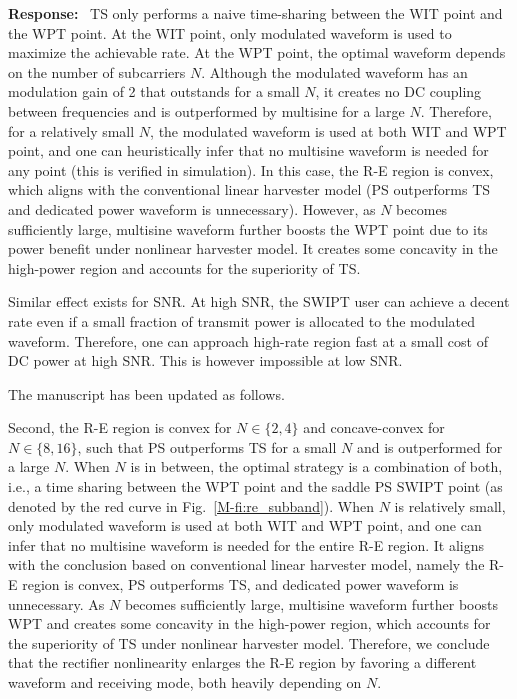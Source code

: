 \documentclass{article}
\newcounter{reviewer}
\newcounter{point}[reviewer]
\newcounter{response}[reviewer]
\newenvironment{response}
	{\refstepcounter{response} \medskip \noindent \textbf{Response:}\ }
	{\medskip}
\begin{document}
\begin{reviewer}
\begin{response}
			TS only performs a naive time-sharing between the WIT point and the WPT point. At the WIT point, only modulated waveform is used to maximize the achievable rate. At the WPT point, the optimal waveform depends on the number of subcarriers $N$. Although the modulated waveform has an modulation gain of \num{2} that outstands for a small $N$, it creates no DC coupling between frequencies and is outperformed by multisine for a large $N$. Therefore, for a relatively small $N$, the modulated waveform is used at both WIT and WPT point, and one can heuristically infer that no multisine waveform is needed for any point (this is verified in simulation). In this case, the R-E region is convex, which aligns with the conventional linear harvester model (PS outperforms TS and dedicated power waveform is unnecessary). However, as $N$ becomes sufficiently large, multisine waveform further boosts the WPT point due to its power benefit under nonlinear harvester model. It creates some concavity in the high-power region and accounts for the superiority of TS.

			Similar effect exists for SNR. At high SNR, the SWIPT user can achieve a decent rate even if a small fraction of transmit power is allocated to the modulated waveform. Therefore, one can approach high-rate region fast at a small cost of DC power at high SNR. This is however impossible at low SNR.

			The manuscript has been updated as follows.
			\begin{framed}
				Second, the R-E region is convex for $N \in \{2,4\}$ and concave-convex for $N \in \{8,16\}$, such that PS outperforms TS for a small $N$ and is outperformed for a large $N$. When $N$ is in between, the optimal strategy is a combination of both, i.e., a time sharing between the WPT point and the saddle PS SWIPT point (as denoted by the red curve in Fig.~\ref{M-fi:re_subband}). When $N$ is relatively small, only modulated waveform is used at both WIT and WPT point, and one can infer that no multisine waveform is needed for the entire R-E region. It aligns with the conclusion based on conventional linear harvester model, namely the R-E region is convex, PS outperforms TS, and dedicated power waveform is unnecessary. As $N$ becomes sufficiently large, multisine waveform further boosts WPT and creates some concavity in the high-power region, which accounts for the superiority of TS under nonlinear harvester model. Therefore, we conclude that the rectifier nonlinearity enlarges the R-E region by favoring a different waveform and receiving mode, both heavily depending on $N$.
			\end{framed}
		\end{response}


\end{reviewer}
\end{document}
